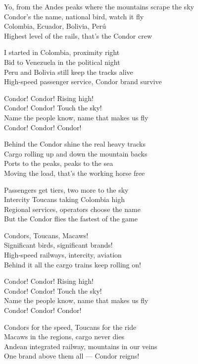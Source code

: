 \begin{lyrics}
Yo, from the Andes peaks where the mountains scrape the sky\\
Condor’s the name, national bird, watch it fly\\
Colombia, Ecuador, Bolivia, Perú\\
Highest level of the rails, that’s the Condor crew

I started in Colombia, proximity right\\
Bid to Venezuela in the political night\\
Peru and Bolivia still keep the tracks alive\\
High-speed passenger service, Condor brand survive

Condor! Condor! Rising high!\\
Condor! Condor! Touch the sky!\\
Name the people know, name that makes us fly\\
Condor! Condor! Condor!

Behind the Condor shine the real heavy tracks\\
Cargo rolling up and down the mountain backs\\
Ports to the peaks, peaks to the sea\\
Moving the load, that’s the working horse free

Passengers get tiers, two more to the sky\\
Intercity Toucans taking Colombia high\\
Regional services, operators choose the name\\
But the Condor flies the fastest of the game

Condors, Toucans, Macaws!\\
Significant birds, significant brands!\\
High-speed railways, intercity, aviation\\
Behind it all the cargo trains keep rolling on!

Condor! Condor! Rising high!\\
Condor! Condor! Touch the sky!\\
Name the people know, name that makes us fly\\
Condor! Condor! Condor!

Condors for the speed, Toucans for the ride\\
Macaws in the regions, cargo never dies\\
Andean integrated railway, mountains in our veins\\
One brand above them all — Condor reigns!


\end{lyrics}
